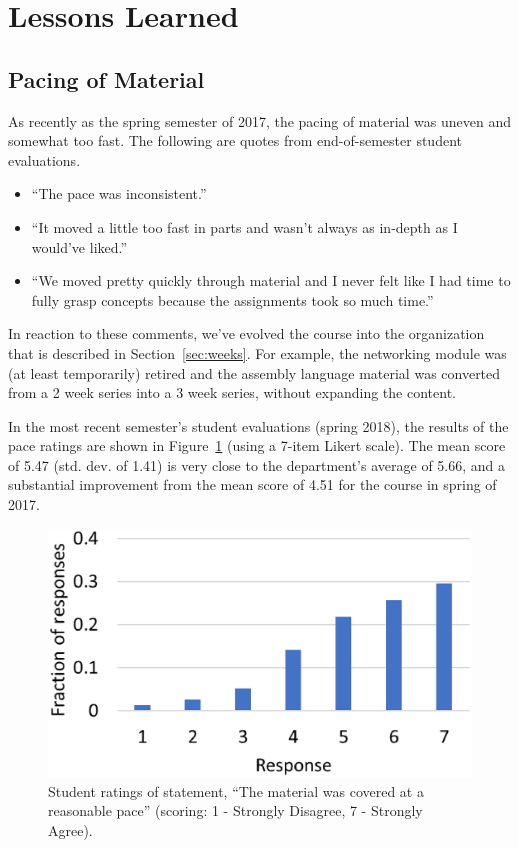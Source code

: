 \section{Lessons Learned}
\label{sec:lessons}


\subsection{Pacing of Material}


As recently as the spring semester of 2017, the pacing of material
was uneven and somewhat too fast.  The following are quotes from
end-of-semester student evaluations.
\begin{itemize}
\item ``The pace was inconsistent.''
\item ``It moved a little too fast in parts and wasn't always as
in-depth as I would've liked.''
\item ``We moved pretty quickly through material and I never felt like I had
time to fully grasp concepts because the assignments took so much time.''
\end{itemize}
In reaction to these comments, we've evolved the course into the organization
that is described in Section~\ref{sec:weeks}.
For example, the networking module was (at least temporarily) retired
and the assembly language material was converted from a
2 week series into a 3 week series, without expanding the content.

In the most recent semester's student evaluations (spring 2018),
the results of the pace ratings are shown in Figure~\ref{fig:pace}
(using a 7-item Likert scale).
The mean score of 5.47 (std. dev. of 1.41)
is very close to the department's average of
5.66, and a substantial improvement from the mean score of 4.51
for the course in spring of 2017.

\begin{figure}[ht]
\centering
\includegraphics[width=0.5\columnwidth]{pace}
\caption{Student ratings of statement, ``The material was covered
at a reasonable pace''  (scoring: 1 - Strongly Disagree, 7 - Strongly Agree).}
\label{fig:pace}
\end{figure}

